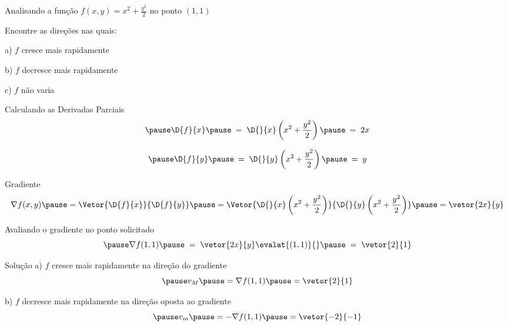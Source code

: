 \begin{question}
  Analisando a função \(f(x, y) = x^2 + \frac{y^2}{2}\)
  no ponto \((1, 1)\)

  Encontre as direções nas quais:

  a)\; $f$ cresce mais rapidamente

  b)\; $f$ decresce mais rapidamente

  c)\; $f$ não varia
\end{question}

\begin{resolution}{Calculando as Derivadas Parciais}
  \[
    \pause
    \D{f}{x}
    \pause
    \:=\; \D{}{x}\left(x^2 + \frac{y^2}{2}\right)
    \pause
    \:=\; 2x
  \]

  \bigskip
  \[
    \pause
    \D{f}{y}
    \pause
    \:=\; \D{}{y}\left(x^2 + \frac{y^2}{2}\right)
    \pause
    \:=\; y
  \]
\end{resolution}

\begin{resolution}{Gradiente}
  \[
    \nabla f(x, y)
    \pause
    = \Vetor{\D{f}{x}}{\D{f}{y}}
    \pause
    = \Vetor{\D{}{x}\left(x^2 + \frac{y^2}{2}\right)}
            {\D{}{y}\left(x^2 + \frac{y^2}{2}\right)}
    \pause
    = \vetor{2x}{y}
  \]

  \pause
  \bigskip
  Avaliando o gradiente no ponto solicitado
  \[
    \pause
    \nabla f(1, 1)
    \pause
    \;=\; \vetor{2x}{y}\evalat{(1, 1)}{}
    \pause
    \;=\; \vetor{2}{1}
  \]
\end{resolution}

\begin{resolution}{Solução}
  a)\; $f$ cresce mais rapidamente
  \pause
  na direção do gradiente
  \[
    \pause
    v_M
    \pause
    = \nabla f(1, 1)
    \pause
    = \vetor{2}{1}
  \]

  \pause
  b)\; $f$ decresce mais rapidamente
  \pause
  na direção oposta ao gradiente
  \[
    \pause
    v_m
    \pause
    = -\nabla f (1, 1)
    \pause
    = \vetor{-2}{-1}
  \]
\end{resolution}

